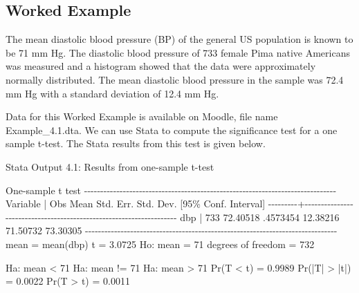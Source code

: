 \documentclass[
]{memoir}
\newenvironment{Shaded}{\begin{snugshade}}{\end{snugshade}}
\newcommand{\NormalTok}[1]{#1}
\begin{document}
\hypertarget{worked-example-4}{%
\subsection{Worked Example}\label{worked-example-4}}

The mean diastolic blood pressure (BP) of the general US population is known to be 71 mm Hg. The diastolic blood pressure of 733 female Pima native Americans was measured and a histogram showed that the data were approximately normally distributed. The mean diastolic blood pressure in the sample was 72.4 mm Hg with a standard deviation of 12.4 mm Hg.

Data for this Worked Example is available on Moodle, file name Example\_4.1.dta. We can use Stata to compute the significance test for a one sample t-test. The Stata results from this test is given below.

Stata Output 4.1: Results from one-sample t-test

\begin{Shaded}
\begin{Highlighting}[]
\NormalTok{One{-}sample t test}
\NormalTok{{-}{-}{-}{-}{-}{-}{-}{-}{-}{-}{-}{-}{-}{-}{-}{-}{-}{-}{-}{-}{-}{-}{-}{-}{-}{-}{-}{-}{-}{-}{-}{-}{-}{-}{-}{-}{-}{-}{-}{-}{-}{-}{-}{-}{-}{-}{-}{-}{-}{-}{-}{-}{-}{-}{-}{-}{-}{-}{-}{-}{-}{-}{-}{-}{-}{-}{-}{-}{-}{-}{-}{-}{-}{-}{-}{-}{-}{-}}
\NormalTok{Variable |     Obs        Mean    Std. Err.   Std. Dev.   [95\% Conf. Interval]}
\NormalTok{{-}{-}{-}{-}{-}{-}{-}{-}{-}+{-}{-}{-}{-}{-}{-}{-}{-}{-}{-}{-}{-}{-}{-}{-}{-}{-}{-}{-}{-}{-}{-}{-}{-}{-}{-}{-}{-}{-}{-}{-}{-}{-}{-}{-}{-}{-}{-}{-}{-}{-}{-}{-}{-}{-}{-}{-}{-}{-}{-}{-}{-}{-}{-}{-}{-}{-}{-}{-}{-}{-}{-}{-}{-}{-}{-}{-}{-}}
\NormalTok{     dbp |     733    72.40518    .4573454    12.38216    71.50732    73.30305}
\NormalTok{{-}{-}{-}{-}{-}{-}{-}{-}{-}{-}{-}{-}{-}{-}{-}{-}{-}{-}{-}{-}{-}{-}{-}{-}{-}{-}{-}{-}{-}{-}{-}{-}{-}{-}{-}{-}{-}{-}{-}{-}{-}{-}{-}{-}{-}{-}{-}{-}{-}{-}{-}{-}{-}{-}{-}{-}{-}{-}{-}{-}{-}{-}{-}{-}{-}{-}{-}{-}{-}{-}{-}{-}{-}{-}{-}{-}{-}{-}}
\NormalTok{    mean = mean(dbp)                                              t =   3.0725}
\NormalTok{Ho: mean = 71                                    degrees of freedom =      732}

\NormalTok{    Ha: mean \textless{} 71               Ha: mean != 71                 Ha: mean \textgreater{} 71}
\NormalTok{ Pr(T \textless{} t) = 0.9989         Pr(|T| \textgreater{} |t|) = 0.0022          Pr(T \textgreater{} t) = 0.0011}
\end{Highlighting}
\end{Shaded}
\end{document}
